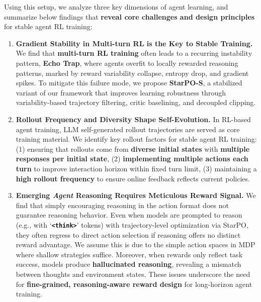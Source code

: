 Using this setup, we analyze three key dimensions of agent learning, and summarize below findings that \textbf{reveal core challenges and design principles} for stable agent RL training:
\vspace{-5pt}
\begin{enumerate}[left=2pt, itemsep=2pt, topsep=4pt]
    \item \textbf{Gradient Stability in Multi-turn RL is the Key to Stable Training.} We find that \textbf{multi-turn RL training} often leads to a recurring instability pattern, \textbf{Echo Trap}, where agents overfit to locally rewarded reasoning patterns, marked by reward variability collapse, entropy drop, and gradient spikes. To mitigate this failure mode, we propose \textbf{StarPO-S}, a stabilized variant of our framework that improves learning robustness through variability-based trajectory filtering, critic baselining, and decoupled clipping.
    
    \item \textbf{Rollout Frequency and Diversity Shape Self-Evolution.} In RL-based agent training, LLM self-generated rollout trajectories are served as core training material. We identify key rollout factors for stable agent RL training: (1) ensuring that rollouts come from \textbf{diverse initial states} with \textbf{multiple responses per initial state}, (2) \textbf{implementing multiple actions each turn} to improve interaction horizon within fixed turn limit, (3) maintaining a \textbf{high rollout frequency} to ensure online feedback reflects current policies. 

    \item \textbf{Emerging \textit{Agent} Reasoning Requires Meticulous Reward Signal.} We find that simply encouraging reasoning in the action format does not guarantee reasoning behavior. Even when models are prompted to reason (e.g., with `\texttt{\textbf{<think>}}' tokens) with trajectory-level optimization via StarPO, they often regress to direct action selection if reasoning offers no distinct reward advantage. We assume this is due to the simple action spaces in MDP where shallow strategies suffice. Moreover, when rewards only reflect task success, models produce \textbf{hallucinated reasoning}, revealing a mismatch between thoughts and environment states. These issues underscore the need for \textbf{fine-grained, reasoning-aware reward design} for long-horizon agent training.



\end{enumerate}
\vspace{-5pt}

